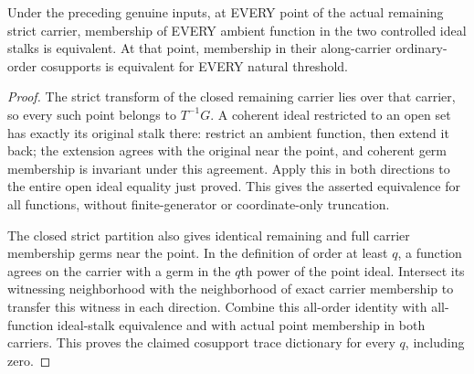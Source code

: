 \begin{theorem}
\label{hir:zero-contact-remainder-all-stalk-orders}
\leanok
{}
Under the preceding genuine inputs, at EVERY point of the actual remaining
strict carrier, membership of EVERY ambient function in the two controlled
ideal stalks is equivalent. At that point, membership in their along-carrier
ordinary-order cosupports is equivalent for EVERY natural threshold.
\end{theorem}
\begin{proof}
The strict transform of the closed remaining carrier lies over that carrier,
so every such point belongs to $T^{-1}G$. A coherent ideal restricted to an
open set has exactly its original stalk there: restrict an ambient function,
then extend it back; the extension agrees with the original near the point,
and coherent germ membership is invariant under this agreement. Apply this
in both directions to the entire open ideal equality just proved. This gives
the asserted equivalence for all functions, without finite-generator or
coordinate-only truncation.

The closed strict partition also gives identical remaining and full carrier
membership germs near the point. In the definition of order at least $q$,
a function agrees on the carrier with a germ in the $q$th power of the point
ideal. Intersect its witnessing neighborhood with the neighborhood of exact
carrier membership to transfer this witness in each direction. Combine this
all-order identity with all-function ideal-stalk equivalence and with actual
point membership in both carriers. This proves the claimed cosupport trace
dictionary for every $q$, including zero.
\end{proof}

